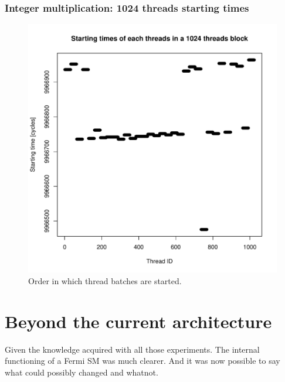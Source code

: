 \documentclass{report}
\def \scalingfactor{.8}
\begin{document}
	\subsection{Integer multiplication: 1024 threads starting times}
    \begin{figure}[H]
    		\centering
		\vspace{-20pt}
	    	\includegraphics[width=\scalingfactor\linewidth]{"graphics/starting_times_ratio31"}
	    	\vspace{-15pt}
	    	\captionsetup{justification=centering}    
	    	\caption{Order in which thread batches are started.}
    \end{figure}
\chapter{Beyond the current architecture}
    Given the knowledge acquired with all those experiments. The internal functioning of a Fermi SM was much clearer. And it was now possible to say what could possibly changed and whatnot.
\end{document}
